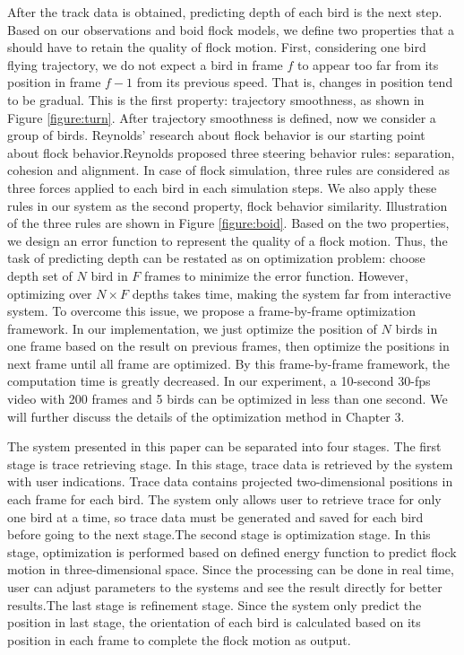 After the track data is obtained, predicting depth of each bird is the next step. Based on our observations and boid flock models, we define two properties that a should have to retain the quality of flock motion. First, considering one bird flying trajectory, we do not expect a bird in frame $f$ to appear too far from its position in frame $f-1$ from its previous speed. That is, changes in position tend to be gradual. This is the first property: trajectory smoothness, as shown in Figure \ref{figure:turn}. After trajectory smoothness is defined, now we consider a group of birds. Reynolds' research about flock behavior \cite{Boid, Steering} is our starting point about flock behavior.Reynolds proposed three steering behavior rules: separation, cohesion and alignment. In case of flock simulation, three rules are considered as three forces applied to each bird in each simulation steps. We also apply these rules in our system as the second property, flock behavior similarity. Illustration of the three rules are shown in Figure \ref{figure:boid}. Based on the two properties, we design an error function to represent the quality of a flock motion. Thus, the task of predicting depth can be restated as on optimization problem: choose depth set of $N$ bird in $F$ frames to minimize the error function. However, optimizing over $N×F$ depths takes time, making the system far from interactive system. To overcome this issue, we propose a frame-by-frame optimization framework. In our implementation, we just optimize the position of $N$ birds in one frame based on the result on previous frames, then optimize the positions in next frame until all frame are optimized. By this frame-by-frame framework, the computation time is greatly decreased. In our experiment, a 10-second 30-fps video with 200 frames and 5 birds can be optimized in less than one second. We will further discuss the details of the optimization method in Chapter 3.



The system presented in this paper can be separated into four stages. The first stage is trace retrieving stage. In this stage, trace data is retrieved by the system with user indications. Trace data contains projected two-dimensional positions in each frame for each bird. The system only allows user to retrieve trace for only one bird at a time, so trace data must be generated and saved for each bird before going to the next stage.The second stage is optimization stage. In this stage, optimization is performed based on defined energy function to predict flock motion in three-dimensional space. Since the processing can be done in real time, user can adjust parameters to the systems and see the result directly for better results.The last stage is refinement stage. Since the system only predict the position in last stage, the orientation of each bird is calculated based on its position in each frame to complete the flock motion as output.


